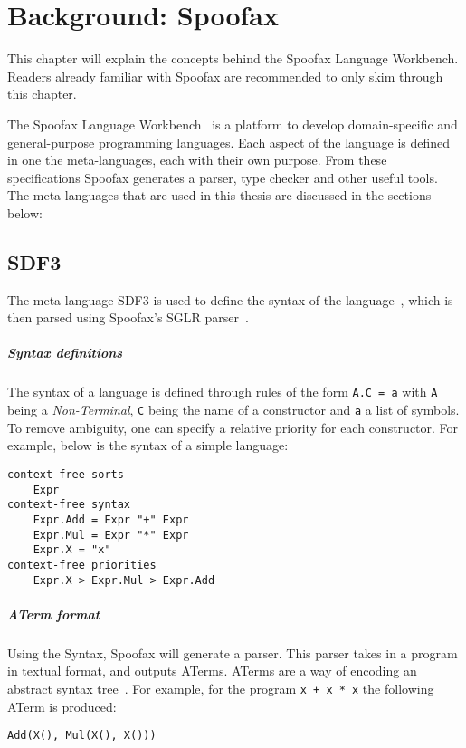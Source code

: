 \chapter{\label{chap:bg-spoofax}Background: Spoofax}

This chapter will explain the concepts behind the Spoofax Language Workbench. Readers already familiar with Spoofax are recommended to only skim through this chapter.

The Spoofax Language Workbench~\cite{spoofax} is a platform to develop domain-specific and
general-purpose programming languages. Each aspect of the language is defined in one the meta-languages, each with their own purpose. From these specifications Spoofax generates a parser, type checker and other useful tools. The meta-languages that are used in this thesis are discussed in the sections below:

\section{SDF3}

The meta-language SDF3 is used to define the syntax of the language~\cite{sdf3}, which is then parsed using Spoofax's SGLR parser~\cite{sdf3_parser}.

\paragraph{Syntax definitions}
The syntax of a language is defined through rules of the form \verb|A.C = a| with \verb|A| being a \emph{Non-Terminal}, \verb|C| being the name of a constructor and \verb|a| a list of symbols. To remove ambiguity, one can specify a relative priority for each constructor. For example, below is the syntax of a simple language:

\lstset{language=SDF3}
\begin{lstlisting}
context-free sorts
	Expr
context-free syntax
	Expr.Add = Expr "+" Expr
	Expr.Mul = Expr "*" Expr
	Expr.X = "x"
context-free priorities
	Expr.X > Expr.Mul > Expr.Add
\end{lstlisting}
\lstset{language=base}

\paragraph{ATerm format}
Using the Syntax, Spoofax will generate a parser. This parser takes in a program in textual format, and outputs ATerms. ATerms are a way of encoding an abstract syntax tree~\cite{aterm}. For example, for the program \verb|x + x * x| the following ATerm is produced:
\begin{lstlisting}
Add(X(), Mul(X(), X()))
\end{lstlisting}

